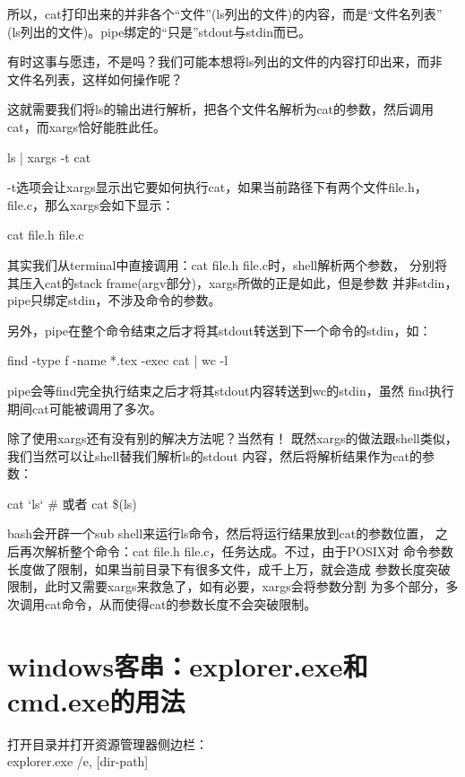 ﻿\documentclass[a4paper,11pt]{article}
\begin{document}
  所以，cat打印出来的并非各个“文件”(ls列出的文件)的内容，而是“文件名列表”
  (ls列出的文件)。pipe绑定的“只是”stdout与stdin而已。

  有时这事与愿违，不是吗？我们可能本想将ls列出的文件的内容打印出来，而非
  文件名列表，这样如何操作呢？

  这就需要我们将ls的输出进行解析，把各个文件名解析为cat的参数，然后调用
  cat，而xargs恰好能胜此任。

  \begin{bashcode}
    ls | xargs -t cat
  \end{bashcode}

  -t选项会让xargs显示出它要如何执行cat，如果当前路径下有两个文件file.h，
  file.c，那么xargs会如下显示：

  \begin{bashcode}
    cat file.h file.c
  \end{bashcode}

  其实我们从terminal中直接调用：cat file.h file.c时，shell解析两个参数，
  分别将其压入cat的stack frame(argv部分)，xargs所做的正是如此，但是参数
  并非stdin，pipe只绑定stdin，不涉及命令的参数。

  另外，pipe在整个命令结束之后才将其stdout转送到下一个命令的stdin，如：

  \begin{bashcode}
    find -type f -name *.tex -exec cat {} \; | wc -l
  \end{bashcode}

  pipe会等find完全执行结束之后才将其stdout内容转送到wc的stdin，虽然
  find执行期间cat可能被调用了多次。


  除了使用xargs还有没有别的解决方法呢？当然有！
  既然xargs的做法跟shell类似，我们当然可以让shell替我们解析ls的stdout
  内容，然后将解析结果作为cat的参数：

  \begin{bashcode}
    cat `ls`
    # 或者
    cat \$(ls)
  \end{bashcode}

  bash会开辟一个sub shell来运行ls命令，然后将运行结果放到cat的参数位置，
  之后再次解析整个命令：cat file.h file.c，任务达成。不过，由于POSIX对
  命令参数长度做了限制，如果当前目录下有很多文件，成千上万，就会造成
  参数长度突破限制，此时又需要xargs来救急了，如有必要，xargs会将参数分割
  为多个部分，多次调用cat命令，从而使得cat的参数长度不会突破限制。

  \section[Windows客串：explorer.exe和cmd.exe的用法]{windows客串：explorer.exe和cmd.exe的用法}
  打开目录并打开资源管理器侧边栏：\\
  explorer.exe /e, [dir-path]
\end{document}
